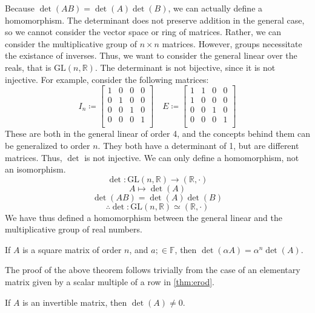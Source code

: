 \begin{remark}
    Because \(\det (AB)=\det (A)\det (B)\), we can actually define a homomorphism. The determinant does not preserve addition in the general case, so we cannot consider the vector space or ring of matrices. Rather, we can consider the multiplicative group of \(n\times n\) matrices. However, groups necessitate the existance of inverses. Thus, we want to consider the general linear over the reals, that is \(\text{GL}(n,\mathbb{R} ) \). The determinant is not bijective, since it is not injective. For example, consider the following matrices:
    \[
        I_n\coloneqq \begin{bmatrix}
            1 &0  &0 &0   \\
             0&1  &0  &0  \\
             0& 0 &1  &0   \\
             0&0  &0  &1   \\
        \end{bmatrix}\quad E\coloneqq \begin{bmatrix}
            1 &1  &0  &0   \\
            1 &0  &0  &0   \\
             0&0  &1  &0   \\
             0&0  &0  &1   \\
        \end{bmatrix}
    \]
    These are both in the general linear of order 4, and the concepts behind them can be generalized to order \(n\). They both have a determinant of 1, but are different matrices. Thus, \(\det \) is not injective. We can only define a homomorphism, not an isomorphism. 
    \[
        \det :\text{GL}(n,\mathbb{R} ) \to (\mathbb{R},\cdot)
    \]
    \[
        A\mapsto \det (A)
    \]
    \[
        \det (AB)=\det (A)\det (B)
    \]
    \[
        \therefore \det : \text{GL}(n,\mathbb{R} ) \simeq (\mathbb{R},\cdot)
    \]
    We have thus defined a homomorphism between the general linear and the multiplicative group of real numbers.
\end{remark}
\begin{theorem}
    If \(A\) is a square matrix of order \(n\), and \(a;\in\mathbb{F} \), then \(\det (\alpha A)=\alpha ^n\det (A)\).
\end{theorem}
The proof of the above theorem follows trivially from the case of an elementary matrix given by a scalar multiple of a row in \ref{thm:erod}.
\begin{theorem}
    If \(A\) is an invertible matrix, then \(\det (A)\neq 0\).
\end{theorem}
